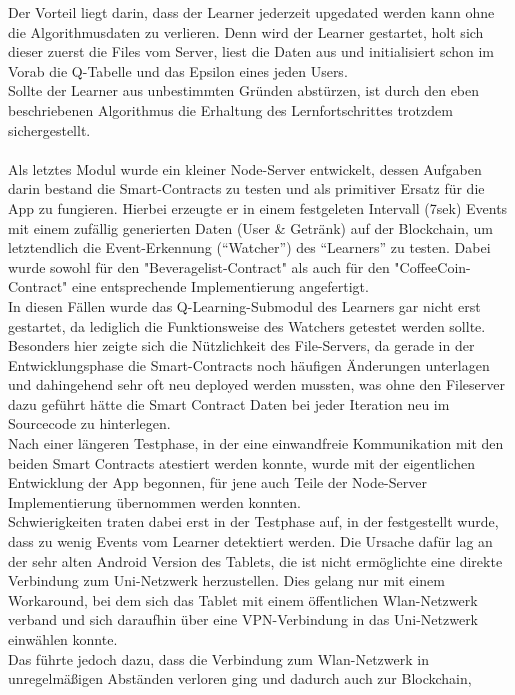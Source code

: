 Der Vorteil liegt darin, dass der Learner jederzeit upgedated werden kann ohne die Algorithmusdaten zu verlieren. Denn wird der Learner gestartet, holt sich dieser zuerst die Files vom Server, liest die Daten aus und initialisiert schon im Vorab die Q-Tabelle und das Epsilon eines jeden Users. \\
Sollte der Learner aus unbestimmten Gründen abstürzen, ist durch den eben beschriebenen Algorithmus die Erhaltung des Lernfortschrittes trotzdem sichergestellt.\\\\
Als letztes Modul wurde ein kleiner Node-Server entwickelt, dessen Aufgaben darin bestand die Smart-Contracts zu testen und als primitiver Ersatz für die App zu fungieren. Hierbei erzeugte er in einem festgeleten Intervall (7sek) Events mit einem zufällig generierten Daten (User \& Getränk) auf der Blockchain, um letztendlich die Event-Erkennung (“Watcher”) des “Learners” zu testen. Dabei wurde sowohl für den "Beveragelist-Contract" als auch für den "CoffeeCoin-Contract" eine entsprechende Implementierung angefertigt.
\\In diesen Fällen wurde das Q-Learning-Submodul des Learners gar nicht erst gestartet, da lediglich die Funktionsweise des Watchers getestet werden sollte.\\
Besonders hier zeigte sich die Nützlichkeit des File-Servers, da gerade in der Entwicklungsphase die Smart-Contracts noch häufigen Änderungen unterlagen und dahingehend sehr oft neu deployed werden mussten, was ohne den Fileserver dazu geführt hätte die Smart Contract Daten bei jeder Iteration neu im Sourcecode zu hinterlegen.\\
Nach einer längeren Testphase, in der eine einwandfreie Kommunikation mit den beiden Smart Contracts atestiert werden konnte, wurde mit der eigentlichen Entwicklung der App begonnen, für jene auch Teile der Node-Server Implementierung übernommen werden konnten.\\
Schwierigkeiten traten dabei erst in der Testphase auf, in der festgestellt wurde, dass zu wenig Events vom Learner detektiert werden. Die Ursache dafür lag an der sehr alten Android Version des Tablets, die ist nicht ermöglichte eine direkte Verbindung zum Uni-Netzwerk herzustellen. Dies gelang nur mit einem Workaround, bei dem sich das Tablet mit einem öffentlichen Wlan-Netzwerk verband und sich daraufhin über eine VPN-Verbindung in das Uni-Netzwerk einwählen konnte. \\
Das führte jedoch dazu, dass die Verbindung zum Wlan-Netzwerk in unregelmäßigen Abständen verloren ging und dadurch auch zur Blockchain, 


